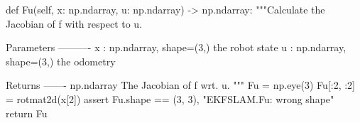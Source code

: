\begin{pythoncode}
def Fu(self, x: np.ndarray, u: np.ndarray) -> np.ndarray:
    """Calculate the Jacobian of f with respect to u.

    Parameters
    ----------
    x : np.ndarray, shape=(3,)
    the robot state
    u : np.ndarray, shape=(3,)
    the odometry

    Returns
    -------
    np.ndarray
    The Jacobian of f wrt. u.
    """
    Fu = np.eye(3)
    Fu[:2, :2] = rotmat2d(x[2])
    assert Fu.shape == (3, 3), "EKFSLAM.Fu: wrong shape"
    return Fu
\end{pythoncode}
